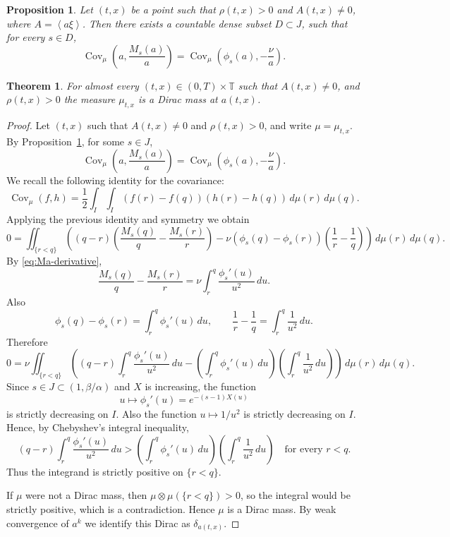 \documentclass[10pt,a4paper]{amsart}
\newtheorem{proposition}{Proposition}
\newtheorem{thm}{Theorem}
\DeclareMathOperator*{\Cov}{\operatorname{Cov}}
\newcommand{\T}{\mathbb{T}}
\newcommand{\av}[1]{\left\langle #1 \right\rangle}
\begin{document}
\begin{proposition}
\label{prop:commutator-on-entropy-family}
Let $(t,x)$ be a point such that $\rho(t,x)>0$ and $A(t,x)\neq 0$, where $A=\av{a\xi}$. Then there exists a countable dense subset $D\subset J$, such that for every $s\in D$,
\begin{equation}
\label{eq:entropy-commutator}
\Cov_\mu \left(a,\frac{M_s(a)}{a}\right)
=
\Cov_\mu \left(\phi_s(a),-\frac{\nu}{a}\right).
\end{equation}

\end{proposition}

\begin{thm}
\label{thm:collapse}
For almost every $(t,x)\in(0,T)\times\T$ such that $A(t,x)\neq0$, and $\rho(t,x)>0$ the measure $\mu_{t,x}$ is a Dirac mass at $a(t,x)$.
\end{thm}

\begin{proof}
Let $(t,x)$ such that $A(t,x)\neq0$ and $\rho(t,x)>0$, and write $\mu=\mu_{t,x}$.
By Proposition~\ref{prop:commutator-on-entropy-family}, for some $s\in J$,
$$
\Cov_\mu \left(a,\frac{M_s(a)}{a}\right)
=
\Cov_\mu \left(\phi_s(a),-\frac{\nu}{a}\right).
$$
We recall the following identity for the covariance: 
$$
\Cov_\mu(f,h)
=
\frac12\int_I\int_I (f(r)-f(q))(h(r)-h(q))\,d\mu(r)\,d\mu(q).
$$
Applying the previous identity and symmetry we obtain
$$
0=
\iint_{\{r<q\}}
\left(
(q-r)\left(\frac{M_s(q)}{q}-\frac{M_s(r)}{r}\right)
-\nu(\phi_s(q)-\phi_s(r))\left(\frac1r-\frac1q\right)
\right)\,d\mu(r)\,d\mu(q).
$$
By \eqref{eq:Ma-derivative},
$$
\frac{M_s(q)}{q}-\frac{M_s(r)}{r}
=
\nu\int_r^q \frac{\phi_s'(u)}{u^2}\,du.
$$
Also
$$
\phi_s(q)-\phi_s(r)=\int_r^q \phi_s'(u)\,du,
\qquad
\frac1r-\frac1q=\int_r^q \frac{1}{u^2}\,du.
$$
Therefore
$$
0=
\nu\iint_{\{r<q\}}
\left(
(q-r)\int_r^q \frac{\phi_s'(u)}{u^2}\,du
-
\left(\int_r^q \phi_s'(u)\,du\right)
\left(\int_r^q \frac{1}{u^2}\,du\right)
\right)\,d\mu(r)\,d\mu(q).
$$
Since $s\in J\subset (1,\beta/\alpha)$ and $X$ is increasing, the function
$$
u\mapsto \phi_s'(u)=e^{-(s-1)X(u)}
$$
is strictly decreasing on $I$. Also the function $u\mapsto 1/u^2$ is strictly decreasing on $I$. Hence, by Chebyshev's integral inequality,
$$
(q-r)\int_r^q \frac{\phi_s'(u)}{u^2}\,du
>
\left(\int_r^q \phi_s'(u)\,du\right)
\left(\int_r^q \frac{1}{u^2}\,du\right)
\quad \text{for every } r<q.
$$
Thus the integrand is strictly positive on $\{r<q\}$.

If $\mu$ were not a Dirac mass, then $\mu\otimes\mu(\{r<q\})>0$, so the integral would be strictly positive, which is a contradiction. Hence $\mu$ is a Dirac mass. By weak convergence of $a^k$ we identify this Dirac as $\delta_{a(t,x)}$.
\end{proof}
\end{document}
